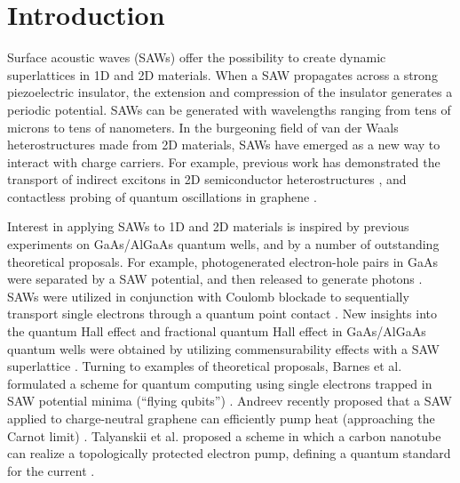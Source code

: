 \documentclass{beavtex_dub_edit}
\begin{document}
\section{Introduction} 

Surface acoustic waves (SAWs) offer the possibility to create dynamic superlattices in 1D and 2D materials. When a SAW propagates across a strong piezoelectric insulator, the extension and compression of the insulator generates a periodic potential. SAWs can be generated with wavelengths ranging from tens of microns to tens of nanometers. In the burgeoning field of van der Waals heterostructures made from 2D materials, SAWs have emerged as a new way to interact with charge carriers. For example, previous work has demonstrated the transport of indirect excitons in 2D semiconductor heterostructures \cite{peng_long-range_2022}, and contactless probing of quantum oscillations in graphene \cite{fang_quantum_2023}.

Interest in applying SAWs to 1D and 2D materials is inspired by previous experiments on GaAs/AlGaAs quantum wells, and by a number of outstanding theoretical proposals. For example, photogenerated electron-hole pairs in GaAs were separated by a SAW potential, and then released to generate photons \cite{rocke_acoustically_1997}. SAWs were utilized in conjunction with Coulomb blockade to sequentially transport single electrons through a quantum point contact \cite{talyanskii_single-electron_1997}. New insights into the quantum Hall effect and fractional quantum Hall effect in GaAs/AlGaAs quantum wells were obtained by utilizing commensurability effects with a SAW superlattice \cite{willett_experimental_1993,kukushkin_collective_2011}. Turning to examples of theoretical proposals, Barnes et al. formulated a scheme for quantum computing using single electrons trapped in SAW potential minima (“flying qubits”) \cite{barnes_quantum_2000,gumbs_quantum_2004,giavaras_quantum_2006}. Andreev recently proposed that a SAW applied to charge-neutral graphene can efficiently pump heat (approaching the Carnot limit) \cite{andreev_electronic_2022}. Talyanskii et al. proposed a scheme in which a carbon nanotube can realize a topologically protected electron pump, defining a quantum standard for the current \cite{talyanskii_quantized_2001}.
\end{document}
